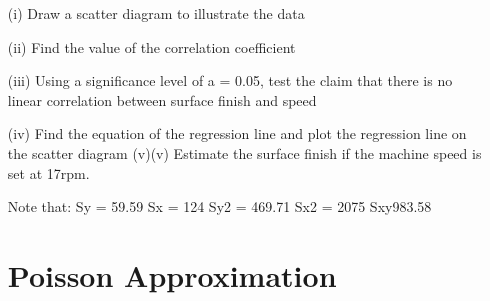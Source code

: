\documentclass[]{report}
\begin{document}
\begin{enumerate}[(i)]
\begin{itemize}
	
	(b) The above data was entered into Minitab and the following output was generated:
	You are requested to fill in the blanks in the following table:
	Analysis of Variance
	
	Source      	      DF          SS          MS         F        P
	Regression      	        x         20.160      20.160   x         0.000
	Residual Error         x        xx              xxx
	Total             	        x         21.460
	
	
	Observation    Number of Bidders	Winning Bid	Fitted value	Residual
	2	8			        6.9 		      x			      x
	
	(8 marks)
	



	The surface finish of a metal part is thought to be linearly related to the cutting speed of the machine which produces it.  Surface finish is measured on an arbitrary scale from 0 to 20, with 0 being the roughest finish.  The following data have been observed:
	
	Surface finish (Y)4.895.956.326.007.709.509.739.50
	Speed (RPM) (X)1213141516171819
	
	\item[(i)]                  Draw a scatter diagram to illustrate the data
	\item[(ii)]                Find the value of the correlation coefficient
	\item[(iii)]               Using a significance level of a = 0.05, test the claim that there is no linear correlation between surface finish and speed
	\item[(iv)]              Find the equation of the regression line and plot the regression line on the scatter diagram
	(v)(v)                Estimate the surface finish if the machine speed is set at 17rpm. 
	
	
	Note that:
	Sy = 59.59
	Sx = 124
	Sy2 = 469.71
	Sx2 = 2075
	Sxy983.58
	
	



\section{Poisson Approximation}


\end{itemize}
\end{enumerate}
\end{document}
